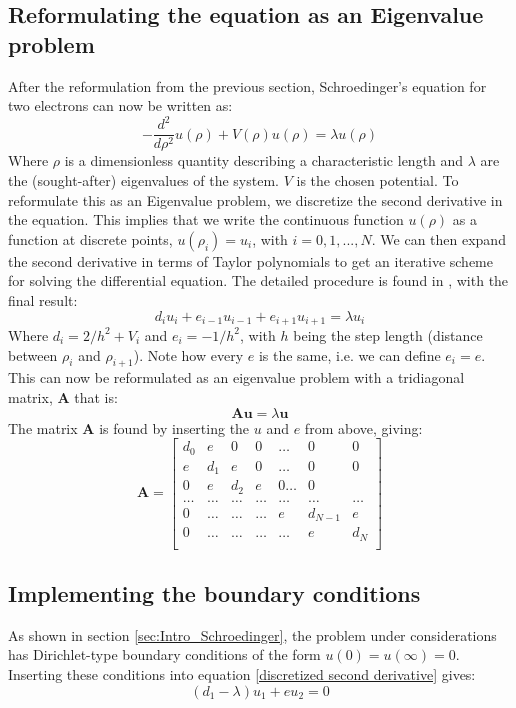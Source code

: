 \documentclass[a4paper, 10pt]{article}
\begin{document}
\subsection{Reformulating the equation as an Eigenvalue problem}
After the reformulation from the previous section, Schroedinger's equation for two electrons can now be written as:
\begin{equation}
-\frac{d^2}{d\rho^2}u(\rho)+V(\rho)u(\rho)=\lambda u(\rho)
\end{equation}
Where $\rho$ is a dimensionless quantity describing a characteristic length and $\lambda$ are the (sought-after) eigenvalues of the system. $V$ is the chosen potential. To reformulate this as an Eigenvalue problem, we discretize the second derivative in the equation. This implies that we write the continuous function $u(\rho)$ as a function at discrete points, $u(\rho_i)=u_i$, with $i=0,1,...,N$. We can then expand the second derivative in terms of Taylor polynomials to get an iterative scheme for solving the differential equation. The detailed procedure is found in \cite{Morten}, with the final result:
\begin{equation}\label{discretized second derivative}
d_iu_i+e_{i-1}u_{i-1}+e_{i+1}u_{i+1}=\lambda u_i
\end{equation}
Where  $d_i=2/h^2+V_i$ and $e_i=-1/h^2$, with $h$ being the step length (distance between $\rho_i$ and $\rho_{i+1}$). Note how every $e$ is the same, i.e. we can define $e_i=e$. This can now be reformulated as an eigenvalue problem with a tridiagonal matrix, $\mathbf{A}$ that is:
\begin{equation}\label{eq:Eigenvalue_problem}
\mathbf{A}\mathbf{u}=\lambda \mathbf{u}
\end{equation}
The matrix $\mathbf{A}$ is found by inserting the $u$ and $e$ from above, giving:
$$\mathbf{A}=\begin{bmatrix}
d_0 & e & 0 & 0 & \dots & 0 & 0\\
e & d_1 & e & 0 & \dots & 0 & 0\\
0 & e & d_2 & e & 0 \dots & 0\\
\dots & \dots & \dots & \dots & \dots& \dots & \dots \\
0 & \dots & \dots &\dots & e & d_{N-1} & e\\
0 & \dots & \dots & \dots & \dots & e & d_N\\
\end{bmatrix}$$
\subsection{Implementing the boundary conditions}
As shown in section \ref{sec:Intro_Schroedinger}, the problem under considerations has Dirichlet-type boundary conditions of the form $u(0)=u(\infty)=0$. Inserting these conditions into equation \ref{discretized second derivative} gives:
$$(d_1-\lambda)u_1+eu_{2}=0$$
\end{document}
